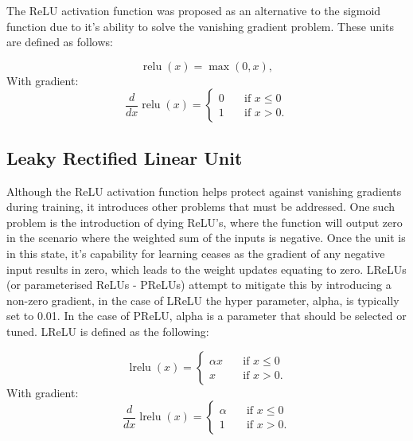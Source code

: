 \documentclass{article}
\DeclareMathOperator{\relu}{relu}
\DeclareMathOperator{\lrelu}{lrelu}
\begin{document}
The ReLU activation function was proposed as an alternative to the sigmoid function due to it's ability to solve the vanishing gradient problem\citep{nair2010rectified}. These units are defined as follows:

\begin{equation}
  \relu(x) = \max(0, x) ,
\end{equation}
With gradient:
\begin{equation}
  \frac{d}{dx} \relu(x) =
     \begin{cases} 
      0      & \quad \text{if } x \leq  0 \\
      1       & \quad \text{if } x > 0 .
    \end{cases} 
\end{equation}

\subsection{Leaky Rectified Linear Unit}

Although the ReLU activation function helps protect against vanishing gradients during training, it introduces other problems that must be addressed. One such problem is the introduction of dying ReLU’s, where the function will output zero in the scenario where the weighted sum of the inputs is negative. Once the unit is in this state, it’s capability for learning ceases as the gradient of any negative input results in zero, which leads to the weight updates equating to zero. LReLUs (or parameterised ReLUs - PReLUs)\citep{he2015delving} attempt to mitigate this by introducing a non-zero gradient, in the case of LReLU the hyper parameter, alpha, is typically set to 0.01. In the case of PReLU, alpha is a parameter that should be selected or tuned. LReLU is defined as the following:

\begin{equation}
  \lrelu(x) = 
    \begin{cases}
      \alpha x      & \quad \text{if } x \leq  0 \\
      x       & \quad \text{if } x > 0 .
    \end{cases}
\end{equation} 
With gradient:
\begin{equation}
  \frac{d}{dx} \lrelu(x) =
     \begin{cases}
      \alpha      & \quad \text{if } x \leq  0 \\
      1       & \quad \text{if } x > 0 .
    \end{cases} 
\end{equation}
\end{document}
